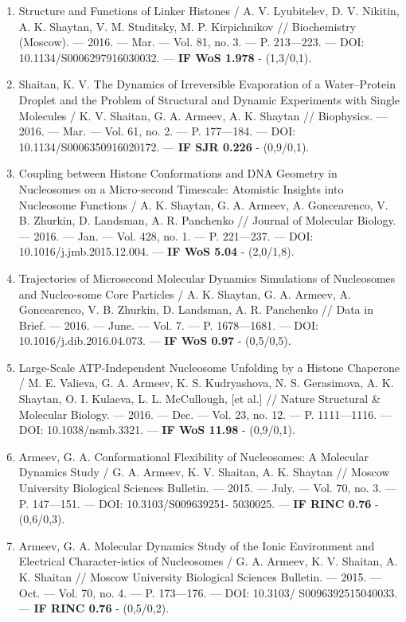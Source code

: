 \begin{frame}[allowframebreaks]
\begin{enumerate}
 \item  Structure and Functions of Linker Histones / A. V. Lyubitelev, D. V. Nikitin, A. K. Shaytan, V. M. Studitsky, M. P. Kirpichnikov // Biochemistry (Moscow). –– 2016. –– Mar. –– Vol. 81, no. 3. –– P. 213––223. –– DOI: 10.1134/S0006297916030032. –– \textbf{IF WoS 1.978} - (1,3/0,1).
 \item  Shaitan, K. V. The Dynamics of Irreversible Evaporation of a Water–Protein Droplet and the Problem of Structural and Dynamic Experiments with Single Molecules / K. V. Shaitan, G. A. Armeev, A. K. Shaytan // Biophysics. –– 2016. –– Mar. –– Vol. 61, no. 2. –– P. 177––184. –– DOI: 10.1134/S0006350916020172. –– \textbf{IF SJR 0.226} - (0,9/0,1).
 \item  Coupling between Histone Conformations and DNA Geometry in Nucleosomes on a Micro-second Timescale: Atomistic Insights into Nucleosome Functions / A. K. Shaytan, G. A. Armeev, A. Goncearenco, V. B. Zhurkin, D. Landsman, A. R. Panchenko // Journal of Molecular Biology. –– 2016. –– Jan. –– Vol. 428, no. 1. –– P. 221––237. –– DOI: 10.1016/j.jmb.2015.12.004. –– \textbf{IF WoS 5.04} - (2,0/1,8).
 \item  Trajectories of Microsecond Molecular Dynamics Simulations of Nucleosomes and Nucleo-some Core Particles / A. K. Shaytan, G. A. Armeev, A. Goncearenco, V. B. Zhurkin, D. Landsman, A. R. Panchenko // Data in Brief. –– 2016. –– June. –– Vol. 7. –– P. 1678––1681. –– DOI: 10.1016/j.dib.2016.04.073. –– \textbf{IF WoS 0.97} - (0,5/0,5).
 \item  Large-Scale ATP-Independent Nucleosome Unfolding by a Histone Chaperone / M. E. Valieva, G. A. Armeev, K. S. Kudryashova, N. S. Gerasimova, A. K. Shaytan, O. I. Kulaeva, L. L. McCullough, [et al.] // Nature Structural \& Molecular Biology. –– 2016. –– Dec. –– Vol. 23, no. 12. –– P. 1111––1116. –– DOI: 10.1038/nsmb.3321. –– \textbf{IF WoS 11.98} - (0,9/0,1).
 \item  Armeev, G. A. Conformational Flexibility of Nucleosomes: A Molecular Dynamics Study / G. A. Armeev, K. V. Shaitan, A. K. Shaytan // Moscow University Biological Sciences Bulletin. –– 2015. –– July. –– Vol. 70, no. 3. –– P. 147––151. –– DOI: 10.3103/S009639251- 5030025. –– \textbf{IF RINC 0.76} - (0,6/0,3).
 \item  Armeev, G. A. Molecular Dynamics Study of the Ionic Environment and Electrical Character-istics of Nucleosomes / G. A. Armeev, K. V. Shaitan, A. K. Shaitan // Moscow University Biological Sciences Bulletin. –– 2015. –– Oct. –– Vol. 70, no. 4. –– P. 173––176. –– DOI: 10.3103/ S0096392515040033. –– \textbf{IF RINC 0.76} - (0,5/0,2).

\end{enumerate}
\end{frame}
